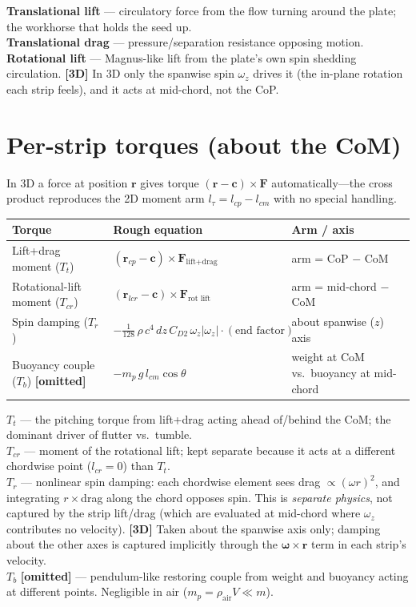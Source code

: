 \documentclass[11pt]{article}
\newcommand{\newin}{{\small\textbf{\color{blue}[3D]}}}
\newcommand{\drop}{{\small\textbf{\color{red!70!black}[omitted]}}}
\begin{document}
\medskip
\noindent\textbf{Translational lift} — circulatory force from the flow turning
around the plate; the workhorse that holds the seed up.\\
\textbf{Translational drag} — pressure/separation resistance opposing motion.\\
\textbf{Rotational lift} — Magnus-like lift from the plate's own spin shedding
circulation. \newin{} In 3D only the spanwise spin $\omega_z$ drives it (the
in-plane rotation each strip feels), and it acts at mid-chord, not the CoP.

\section*{Per-strip torques (about the CoM)}
In 3D a force at position $\mathbf{r}$ gives torque $(\mathbf{r}-\mathbf{c})\times\mathbf{F}$
automatically---the cross product reproduces the 2D moment arm
$l_\tau=l_{cp}-l_{cm}$ with no special handling.

\begin{tabularx}{\textwidth}{@{} l >{\raggedright\arraybackslash}p{} L @{}}
\toprule
\textbf{Torque} & \textbf{Rough equation} & \textbf{Arm / axis} \\
\midrule
Lift+drag moment ($T_t$) &
$(\mathbf{r}_{cp}-\mathbf{c})\times \mathbf{F}_{\text{lift+drag}}$ &
arm = CoP $-$ CoM \\

Rotational-lift moment ($T_{cr}$) &
$(\mathbf{r}_{lcr}-\mathbf{c})\times \mathbf{F}_{\text{rot lift}}$ &
arm = mid-chord $-$ CoM \\

Spin damping ($T_r$) &
$-\tfrac{1}{128}\,\rho\,c^4\,dz\,C_{D2}\,\omega_z|\omega_z|\cdot(\text{end factor})$ &
about spanwise ($z$) axis \\

Buoyancy couple ($T_b$) \drop{} &
$-m_p\,g\,l_{cm}\cos\theta$ &
weight at CoM vs.\ buoyancy at mid-chord \\
\bottomrule
\end{tabularx}

\medskip
\noindent\textbf{$T_t$} — the pitching torque from lift+drag acting ahead of/behind
the CoM; the dominant driver of flutter vs.\ tumble.\\
\textbf{$T_{cr}$} — moment of the rotational lift; kept separate because it acts at
a different chordwise point ($l_{cr}=0$) than $T_t$.\\
\textbf{$T_r$} — nonlinear spin damping: each chordwise element sees drag
$\propto(\omega r)^2$, and integrating $r\times$drag along the chord opposes spin.
This is \emph{separate physics}, not captured by the strip lift/drag (which are
evaluated at mid-chord where $\omega_z$ contributes no velocity). \newin{} Taken
about the spanwise axis only; damping about the other axes is captured implicitly
through the $\boldsymbol\omega\times\mathbf r$ term in each strip's velocity.\\
\textbf{$T_b$} \drop{} — pendulum-like restoring couple from weight and buoyancy
acting at different points. Negligible in air ($m_p=\rho_{\text{air}}V\ll m$).
\end{document}
